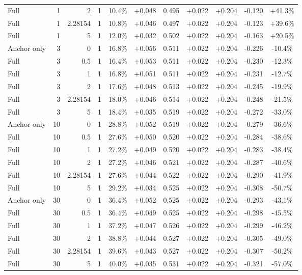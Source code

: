 \begin{table}[htbp]
\begin{tabular}{lrrrccccccc}
Full & 1 & 2 & 1 & 10.4\% & +0.048 & 0.495 & +0.022 & +0.204 & -0.120 & +41.3\% \\
Full & 1 & 2.28154 & 1 & 10.8\% & +0.046 & 0.497 & +0.022 & +0.204 & -0.123 & +39.6\% \\
Full & 1 & 5 & 1 & 12.0\% & +0.032 & 0.502 & +0.022 & +0.204 & -0.163 & +20.5\% \\
Anchor only & 3 & 0 & 1 & 16.8\% & +0.056 & 0.511 & +0.022 & +0.204 & -0.226 & -10.4\% \\
Full & 3 & 0.5 & 1 & 16.4\% & +0.053 & 0.511 & +0.022 & +0.204 & -0.230 & -12.3\% \\
Full & 3 & 1 & 1 & 16.8\% & +0.051 & 0.511 & +0.022 & +0.204 & -0.231 & -12.7\% \\
Full & 3 & 2 & 1 & 17.6\% & +0.048 & 0.513 & +0.022 & +0.204 & -0.245 & -19.9\% \\
Full & 3 & 2.28154 & 1 & 18.0\% & +0.046 & 0.514 & +0.022 & +0.204 & -0.248 & -21.5\% \\
Full & 3 & 5 & 1 & 18.4\% & +0.035 & 0.519 & +0.022 & +0.204 & -0.272 & -33.0\% \\
Anchor only & 10 & 0 & 1 & 28.8\% & +0.052 & 0.519 & +0.022 & +0.204 & -0.279 & -36.6\% \\
Full & 10 & 0.5 & 1 & 27.6\% & +0.050 & 0.520 & +0.022 & +0.204 & -0.284 & -38.6\% \\
Full & 10 & 1 & 1 & 27.2\% & +0.049 & 0.520 & +0.022 & +0.204 & -0.283 & -38.4\% \\
Full & 10 & 2 & 1 & 27.2\% & +0.046 & 0.521 & +0.022 & +0.204 & -0.287 & -40.6\% \\
Full & 10 & 2.28154 & 1 & 27.6\% & +0.044 & 0.522 & +0.022 & +0.204 & -0.290 & -41.9\% \\
Full & 10 & 5 & 1 & 29.2\% & +0.034 & 0.525 & +0.022 & +0.204 & -0.308 & -50.7\% \\
Anchor only & 30 & 0 & 1 & 36.4\% & +0.052 & 0.525 & +0.022 & +0.204 & -0.293 & -43.1\% \\
Full & 30 & 0.5 & 1 & 36.4\% & +0.049 & 0.525 & +0.022 & +0.204 & -0.298 & -45.5\% \\
Full & 30 & 1 & 1 & 37.2\% & +0.047 & 0.526 & +0.022 & +0.204 & -0.299 & -46.2\% \\
Full & 30 & 2 & 1 & 38.8\% & +0.044 & 0.527 & +0.022 & +0.204 & -0.305 & -49.0\% \\
Full & 30 & 2.28154 & 1 & 39.6\% & +0.043 & 0.527 & +0.022 & +0.204 & -0.307 & -50.2\% \\
Full & 30 & 5 & 1 & 40.0\% & +0.035 & 0.531 & +0.022 & +0.204 & -0.321 & -57.0\% \\

\end{tabular}
\end{table}
